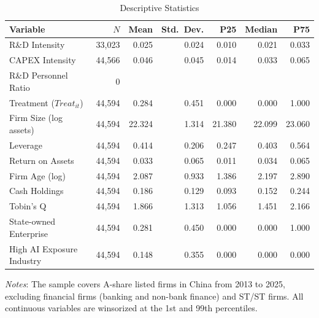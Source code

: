 \begin{table}[htbp]
\centering
\caption{Descriptive Statistics}
\label{tab:descriptive}
\begin{threeparttable}
\begin{tabular}{lrrrrrr}
\toprule
Variable & $N$ & Mean & Std.\ Dev. & P25 & Median & P75 \\
\midrule
R\&D Intensity & 33,023 & 0.025 & 0.024 & 0.010 & 0.021 & 0.033 \\
CAPEX Intensity & 44,566 & 0.046 & 0.045 & 0.014 & 0.033 & 0.065 \\
R\&D Personnel Ratio & 0 &  &  &  &  &  \\
Treatment ($Treat_{it}$) & 44,594 & 0.284 & 0.451 & 0.000 & 0.000 & 1.000 \\
Firm Size (log assets) & 44,594 & 22.324 & 1.314 & 21.380 & 22.099 & 23.060 \\
Leverage & 44,594 & 0.414 & 0.206 & 0.247 & 0.403 & 0.564 \\
Return on Assets & 44,594 & 0.033 & 0.065 & 0.011 & 0.034 & 0.065 \\
Firm Age (log) & 44,594 & 2.087 & 0.933 & 1.386 & 2.197 & 2.890 \\
Cash Holdings & 44,594 & 0.186 & 0.129 & 0.093 & 0.152 & 0.244 \\
Tobin's Q & 44,594 & 1.866 & 1.313 & 1.056 & 1.451 & 2.166 \\
State-owned Enterprise & 44,594 & 0.281 & 0.450 & 0.000 & 0.000 & 1.000 \\
High AI Exposure Industry & 44,594 & 0.148 & 0.355 & 0.000 & 0.000 & 0.000 \\
\bottomrule
\end{tabular}
\begin{tablenotes}
\small
\item \textit{Notes}: The sample covers A-share listed firms in China from 2013 to 2025, excluding financial firms (banking and non-bank finance) and ST/\*ST firms. All continuous variables are winsorized at the 1st and 99th percentiles.
\end{tablenotes}
\end{threeparttable}
\end{table}